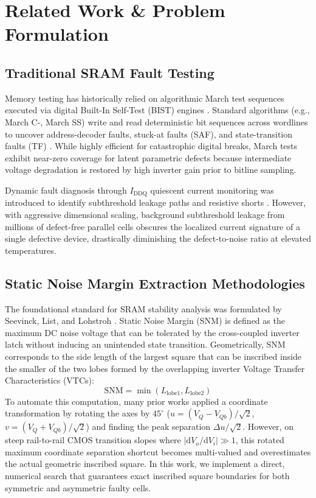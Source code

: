 \documentclass[conference]{IEEEtran}
\begin{document}

\section{Related Work \& Problem Formulation}
\label{sec:related}

\subsection{Traditional SRAM Fault Testing}
Memory testing has historically relied on algorithmic March test sequences executed via digital Built-In Self-Test (BIST) engines \cite{hamdioui2003dynamic, vandegoor1993march}. Standard algorithms (e.g., March C-, March SS) write and read deterministic bit sequences across wordlines to uncover address-decoder faults, stuck-at faults (SAF), and state-transition faults (TF) \cite{vandegoor2000functional, pavlov2004sram}. While highly efficient for catastrophic digital breaks, March tests exhibit near-zero coverage for latent parametric defects because intermediate voltage degradation is restored by high inverter gain prior to bitline sampling.

Dynamic fault diagnosis through $I_{\text{DDQ}}$ quiescent current monitoring was introduced to identify subthreshold leakage paths and resistive shorts \cite{mukhopadhyay2005modeling}. However, with aggressive dimensional scaling, background subthreshold leakage from millions of defect-free parallel cells obscures the localized current signature of a single defective device, drastically diminishing the defect-to-noise ratio at elevated temperatures.

\subsection{Static Noise Margin Extraction Methodologies}
The foundational standard for SRAM stability analysis was formulated by Seevinck, List, and Lohstroh \cite{seevinck1987static}. Static Noise Margin (SNM) is defined as the maximum DC noise voltage that can be tolerated by the cross-coupled inverter latch without inducing an unintended state transition. Geometrically, SNM corresponds to the side length of the largest square that can be inscribed inside the smaller of the two lobes formed by the overlapping inverter Voltage Transfer Characteristics (VTCs):
\begin{equation}
\text{SNM} = \min(L_{\text{lobe1}}, L_{\text{lobe2}})
\label{eq:snm_def}
\end{equation}
To automate this computation, many prior works applied a coordinate transformation by rotating the axes by $45^\circ$ ($u = (V_Q - V_{Qb})/\sqrt{2}$, $v = (V_Q + V_{Qb})/\sqrt{2}$) and finding the peak separation $\Delta u / \sqrt{2}$. However, on steep rail-to-rail CMOS transition slopes where $|\mathrm{d}V_o / \mathrm{d}V_i| \gg 1$, this rotated maximum coordinate separation shortcut becomes multi-valued and overestimates the actual geometric inscribed square. In this work, we implement a direct, numerical search that guarantees exact inscribed square boundaries for both symmetric and asymmetric faulty cells.
\end{document}
